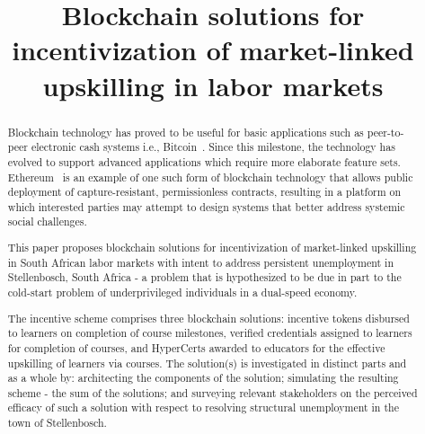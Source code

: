 \documentclass[conference]{IEEEtran}
\begin{document}
\title{Blockchain solutions for incentivization of market-linked upskilling in labor markets}

\author{
	\and

}

\maketitle

\begin{abstract}
	Blockchain technology has proved to be useful for basic applications such as peer-to-peer electronic cash systems i.e., Bitcoin~\cite{nakamoto2008bitcoin}.  Since this milestone, the technology has evolved to support advanced applications which require more elaborate feature sets. Ethereum~\cite{buterin2014ethereum} is an example of one such form of blockchain technology that allows public deployment of capture-resistant, permissionless contracts, resulting in a platform on which interested parties may attempt to design systems that better address systemic social challenges.

	This paper proposes blockchain solutions for incentivization of market-linked upskilling in South African labor markets with intent to address persistent unemployment in Stellenbosch, South Africa - a problem that is hypothesized to be due in part to the cold-start problem of underprivileged individuals in a dual-speed economy.

	The incentive scheme comprises three blockchain solutions: incentive tokens disbursed to learners on completion of course milestones, verified credentials assigned to learners for completion of courses, and HyperCerts awarded to educators for the effective upskilling of learners via courses.
	The solution(s) is investigated in distinct parts and as a whole by: architecting the components of the solution; simulating the resulting scheme - the sum of the solutions; and surveying relevant stakeholders on the perceived efficacy of such a solution with respect to resolving structural unemployment in the town of Stellenbosch.

\end{abstract}
\end{document}
